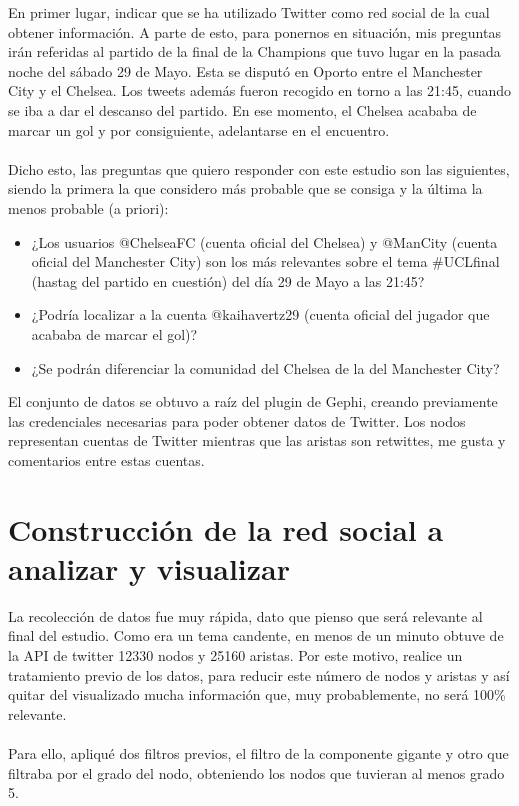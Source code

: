 En primer lugar, indicar que se ha utilizado Twitter como red social de la cual
obtener información. A parte de esto, para ponernos en situación, mis preguntas
irán referidas al partido de la final de la Champions que tuvo lugar en la
pasada noche del sábado 29 de Mayo. Esta se disputó en Oporto entre el
Manchester City y el Chelsea. Los tweets además fueron recogido en torno a las
21:45, cuando se iba a dar el descanso del partido. En ese momento, el Chelsea
acababa de marcar un gol y por consiguiente, adelantarse en el encuentro. 
\\\\
Dicho esto, las preguntas que quiero responder con este estudio son las
siguientes, siendo la primera la que considero más probable que se consiga y la
última la menos probable (a priori):
\begin{itemize}
	\item ¿Los usuarios @ChelseaFC (cuenta oficial del Chelsea) y @ManCity (cuenta
	oficial del Manchester City) son los más relevantes sobre el tema \#UCLfinal
	(hastag del partido en cuestión) del día 29 de Mayo a las 21:45?
	\item ¿Podría localizar a la cuenta @kaihavertz29 (cuenta oficial del jugador
	que acababa de marcar el gol)?
	\item ¿Se podrán diferenciar la comunidad del Chelsea de la del Manchester
	City?
\end{itemize}

El conjunto de datos se obtuvo a raíz del plugin de Gephi, creando previamente
las credenciales necesarias para poder obtener datos de Twitter. Los nodos representan cuentas de Twitter mientras que las aristas son retwittes, me gusta y comentarios entre estas cuentas.

\section{Construcción de la red social a analizar y visualizar}

La recolección de datos fue muy rápida, dato que pienso que será relevante al
final del estudio. Como era un tema candente, en menos de un minuto obtuve de la
API de twitter 12330 nodos y 25160 aristas. Por este motivo, realice un
tratamiento previo de los datos, para reducir este número de nodos y aristas y
así quitar del visualizado mucha información que, muy probablemente, no será
100\% relevante.
\\\\
Para ello, apliqué dos filtros previos, el filtro de la componente gigante y
otro que filtraba por el grado del nodo, obteniendo los nodos que tuvieran al
menos grado 5. 

